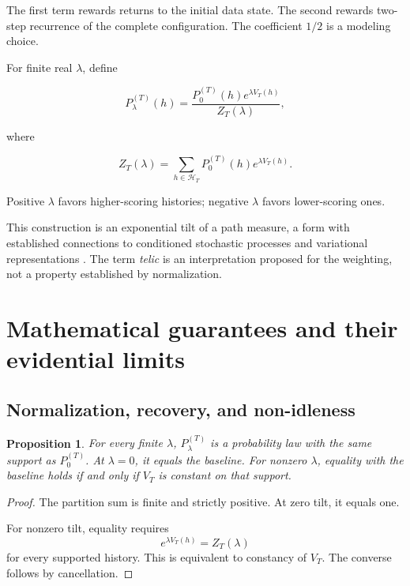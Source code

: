 \documentclass[11pt]{article}
\newtheorem{proposition}{Proposition}
\theoremstyle{remark}
\newcommand{\Hcal}{\mathcal{H}}
\begin{document}
The first term rewards returns to the initial data state. The second rewards two-step recurrence of the complete configuration. The coefficient \(1/2\) is a modeling choice.

For finite real \(\lambda\), define

\begin{equation}
P_\lambda^{(T)}(h)
=
\frac{
P_0^{(T)}(h)e^{\lambda V_T(h)}
}{
Z_T(\lambda)
},
\end{equation}

where

\begin{equation}
Z_T(\lambda)
=
\sum_{h\in\Hcal_T}
P_0^{(T)}(h)e^{\lambda V_T(h)}.
\end{equation}

Positive \(\lambda\) favors higher-scoring histories; negative \(\lambda\) favors lower-scoring ones.

This construction is an exponential tilt of a path measure, a form with established connections to conditioned stochastic processes and variational representations \cite{chetrite2015ld,chetrite2015control}. The term \emph{telic} is an interpretation proposed for the weighting, not a property established by normalization.

\section{Mathematical guarantees and their evidential limits}

\subsection{Normalization, recovery, and non-idleness}

\begin{proposition}
For every finite \(\lambda\), \(P_\lambda^{(T)}\) is a probability law with the same support as \(P_0^{(T)}\). At \(\lambda=0\), it equals the baseline. For nonzero \(\lambda\), equality with the baseline holds if and only if \(V_T\) is constant on that support.
\end{proposition}

\begin{proof}
The partition sum is finite and strictly positive. At zero tilt, it equals one.

For nonzero tilt, equality requires
\begin{equation}
e^{\lambda V_T(h)}=Z_T(\lambda)
\end{equation}
for every supported history. This is equivalent to constancy of \(V_T\). The converse follows by cancellation.
\end{proof}
\end{document}
